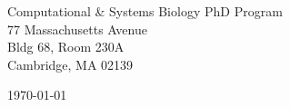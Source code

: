 \begin{minipage}{0.49\textwidth}
\begin{flushleft}
\noindent
Computational \& Systems Biology PhD Program\\
77 Massachusetts Avenue\\
Bldg 68, Room 230A\\
Cambridge, MA 02139
\end{flushleft}
\end{minipage}
\begin{minipage}{0.47\textwidth}
\begin{flushright}
\today
\end{flushright}
\end{minipage} \\

\newcommand{\univ}{Massachusetts Institute of Technology}
\newcommand{\univshort}{MIT}
\newcommand{\degree}{Ph.D.}
\newcommand{\dept}{Computational and Systems Biology}
